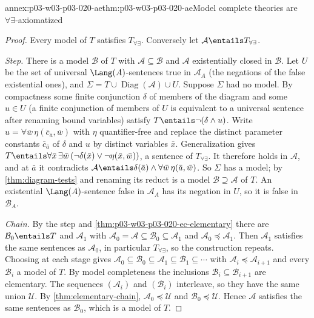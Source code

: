 \begin{annexitem}{annex:p03-w03-p03-020-ae}{thm:p03-w03-p03-020-ae}{Model complete theories are \(\forall\exists\)-axiomatized}
\begin{proof}
Every model of \(T\) satisfies \(T_{\forall\exists}\). Conversely let
\(\mathcal A\entails T_{\forall\exists}\).

\emph{Step.} There is a model \(\mathcal B\) of \(T\) with
\(\mathcal A\subseteq\mathcal B\) and \(\mathcal A\) existentially closed in
\(\mathcal B\). Let \(U\) be the set of universal \(\Lang(A)\)-sentences
true in \(\mathcal A_A\) (the negations of the false existential ones), and
\(\Sigma=T\cup\operatorname{Diag}(\mathcal A)\cup U\). Suppose \(\Sigma\)
had no model. By compactness some finite conjunction \(\delta\) of members
of the diagram and some \(u\in U\) (a finite conjunction of members of
\(U\) is equivalent to a universal sentence after renaming bound variables)
satisfy \(T\entails\neg(\delta\land u)\). Write
\(u=\forall\bar w\,\eta(\bar c_{\bar a},\bar w)\) with \(\eta\)
quantifier-free and replace the distinct parameter constants
\(\bar c_{\bar a}\) of \(\delta\) and \(u\) by distinct variables \(\bar x\).
Generalization gives
\(T\entails\forall\bar x\,\exists\bar w\,(\neg\delta(\bar x)\lor
\neg\eta(\bar x,\bar w))\), a sentence of \(T_{\forall\exists}\). It
therefore holds in \(\mathcal A\), and at \(\bar a\) it contradicts
\(\mathcal A\entails\delta(\bar a)\land\forall\bar w\,\eta(\bar a,\bar w)\).
So \(\Sigma\) has a model; by \cref{thm:diagram-tests} and renaming its
reduct is a model \(\mathcal B\supseteq\mathcal A\) of \(T\). An
existential \(\Lang(A)\)-sentence false in \(\mathcal A_A\) has its
negation in \(U\), so it is false in \(\mathcal B_A\).

\emph{Chain.} By the step and
\cref{thm:p03-w03-p03-020-ec-elementary} there are
\(\mathcal B_0\entails T\) and \(\mathcal A_1\) with
\(\mathcal A_0=\mathcal A\subseteq\mathcal B_0\subseteq\mathcal A_1\) and
\(\mathcal A_0\preccurlyeq\mathcal A_1\). Then \(\mathcal A_1\) satisfies
the same sentences as \(\mathcal A_0\), in particular
\(T_{\forall\exists}\), so the construction repeats. Choosing at each stage
gives \(\mathcal A_0\subseteq\mathcal B_0\subseteq\mathcal A_1\subseteq
\mathcal B_1\subseteq\cdots\) with \(\mathcal A_i\preccurlyeq\mathcal A_{i+1}\)
and every \(\mathcal B_i\) a model of \(T\). By model completeness the
inclusions \(\mathcal B_i\subseteq\mathcal B_{i+1}\) are elementary. The
sequences \((\mathcal A_i)\) and \((\mathcal B_i)\) interleave, so they have
the same union \(\mathcal U\). By \cref{thm:elementary-chain},
\(\mathcal A_0\preccurlyeq\mathcal U\) and
\(\mathcal B_0\preccurlyeq\mathcal U\). Hence \(\mathcal A\) satisfies the
same sentences as \(\mathcal B_0\), which is a model of \(T\).
\end{proof}
\end{annexitem}

